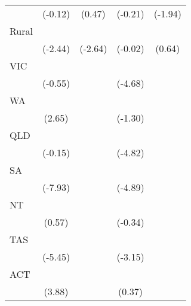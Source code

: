 {\begin{tabular}{l*{4}{c}}
                    &     (-0.12)         &      (0.47)         &     (-0.21)         &     (-1.94)         \\
[1em]
Rural               &            \sym{*}  &            \sym{**} &                     &                     \\
                    &     (-2.44)         &     (-2.64)         &     (-0.02)         &      (0.64)         \\
[1em]
VIC                 &                     &                     &            \sym{***}&                     \\
                    &     (-0.55)         &                     &     (-4.68)         &                     \\
[1em]
WA                  &            \sym{**} &                     &                     &                     \\
                    &      (2.65)         &                     &     (-1.30)         &                     \\
[1em]
QLD                 &                     &                     &            \sym{***}&                     \\
                    &     (-0.15)         &                     &     (-4.82)         &                     \\
[1em]
SA                  &            \sym{***}&                     &            \sym{***}&                     \\
                    &     (-7.93)         &                     &     (-4.89)         &                     \\
[1em]
NT                  &                     &                     &                     &                     \\
                    &      (0.57)         &                     &     (-0.34)         &                     \\
[1em]
TAS                 &            \sym{***}&                     &            \sym{**} &                     \\
                    &     (-5.45)         &                     &     (-3.15)         &                     \\
[1em]
ACT                 &            \sym{***}&                     &                     &                     \\
                    &      (3.88)         &                     &      (0.37)         &                     \\

\end{tabular}}
